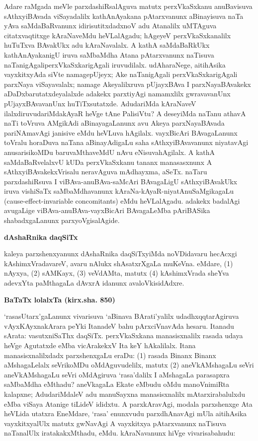 Adare raMgada meVle parxdashiRsalAguva matutx perxVkaSxkanu anuBavisuva sAthxyi\break\-BAvada viSayadalilx kathAnAyakana pAtarxvanunx aBinayisuva naTa yAva saMdaBaR\-vanunx idirisutitxdadxnoV adu Atanalilx uMTAguva citatxvaqtitxge kAraNaveMdu heVLa\break\-lAgadu; hAgeyeV perxVkaSxkanalilx huTuTxva BAvakUkx adu kAraNavalalx. A kathA saMda\-BaRkUkx kathAnAyakanigU iruva saMbaMdha Atana pAtarxvanunx naTisuva naTanigAgali\break perxVkaSxkarigAgali iruvudilalx. udAharaNege, aitihAsika vayxkitxyAda siVte namage\break pUjeyx; Ake naTanigAgali perxVkaSxkarigAgali parxNaya viSayavalalx; namage Akeyalilxruva pUjayxBAva I parxNayaBAvakekx aDaDxbarutatxdeyalalxde adakekx parxtiyAgi namamxlilx gwrava\break\-vanUnx pUjayxBAvavanUnx huTiTxsutatxde. AdudariMda kAraNaveV ilalxdiruvudariMda\break kAyaR heVge tAne PalisiVtu? A deseyiMda naTanu athavA naTi toVruva AMgikAdi aBinayagaLanunx avu Akeya parxNayaBAvada pariNAmavAgi janisive eMdu heVLuva hAgilalx. vayxBicAri BAvagaLanunx toVralu horaDuva naTana aBinayAdigaLu saha sAthxyiBAvavanunx niyatavAgi anusarisikoMDu baruvaMthaveMdU nAvu eNisuva\break hAgilalx. A kathA saMdaBaRvelalxvU kUDa perxVkaSxkanu tananx manasasxnunx A sAthxyiBAvakekxVri\-salu neravAguva mAdhayxma, aSeTx. naTaru parxdashiRsuva I viBAva-anuBAva-\hbox{saMcAri} BAvagaLigU sAthxyiBAvakUkx iruva vishiSaTx saMbaMdhavanunx kAraNa-kAyaR-niya\-tAnu\-SaMgikagaLu {\rm(cause-effect-invariable concomitants)} eMdu heVLalAgadu. adakekx badalAgi avugaLige viBAva-anuBAva-vayxBicAri BAvagaLeMba pAriBASika shabadxgaLanunx parxyoVgisalAgide.

\bigskip
\begin{center}
{\Large\bf dAshaRnika daqSiTx}
\end{center}

kaleya parxshenxyanunx dAshaRnika daqSiTxyiMda noVDidavaru hecAcxgi kAshimxVradavareV, avaru nAlukx shAsatxrXgaLa muKeVna. eMdare, (1) nAyxya, (2) sAMKayx, (3) veVdAMta, matutx (4) kAshimxVrada sheYva adevxYta paMthagaLa dAvxrA idanunx avaloVkisidAdxre.

\bigskip
\begin{center}
{\Large\bf BaTaTx lolalxTa (kirx.sha. 850)}
\end{center}

`rasasUtarx'gaLanunx vivarisuva `aBinava BArati'yalilx udadhxqqtarAgiruva vAyxKAyxna\-kArara peYki ItanadeV bahu pArxciVnavAda hesaru. Itanadu sArata: vasutxniSaThx daqSiTx. perxVkaSxkana manasisxnalilx rasada udaya heVge Agutatxde eMba vicArakekxV Ita keY hAkalilalx. Itana manasisxnalilxdadx parxshenxgaLu eraDu: (1) rasada Binanx Binanx aMshagaLelalx seVrikoMDu oMdAguvudelilx, matutx (2) aneVkAMshagaLu seVri aneVkAMshagaLu seVri oMdAgiruva `rasa'dalilx I aMshagaLa parasapxra saMbaMdha eMthadu? aneVkagaLa Ekate eMbudu oMdu manoVnimiRta kalapxne; AdudariMdaleV adu manuSayxna manasisxnalilx mAtarx\break irabalulxdu eMba viSaya Atanige tiLideV ididxtu. A parxkAravAgi, modala parxshenxge Ata heVLida utatxra EneMdare, `rasa' enunxvudu parxdhAnavAgi mUla aitihAsika vayxkitxyalUlx matutx gwNavAgi A vayxkitxya pAtarxvanunx naTisuva naTanalUlx iratakakxMthadu, eMdu. kAraNavanunx hiVge vivarisabahudu:


